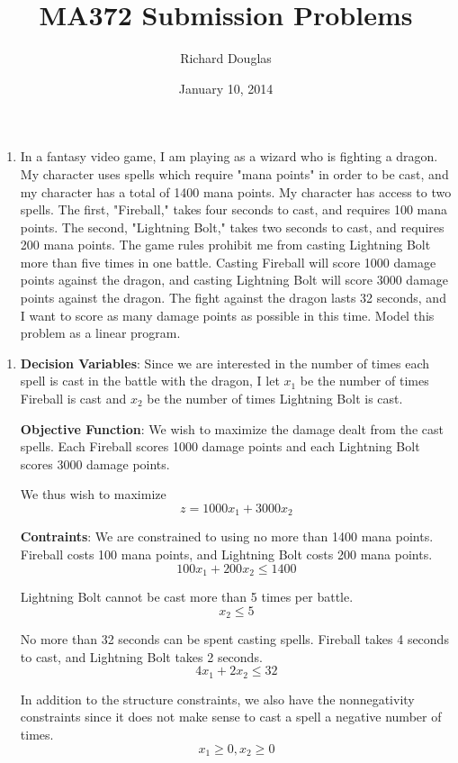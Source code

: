 \documentclass{article}
\title{MA372 Submission Problems}
\author{Richard Douglas}
\date{January 10,  2014}
\begin{document}
  \maketitle
  \begin{enumerate}
  \item In a fantasy video game, I am playing as a wizard who is fighting a dragon. My character
  uses spells which require "mana points" in order to be cast, and my character has a total of
  1400 mana points. My character has access to two spells. The first, "Fireball," takes four
  seconds to cast, and requires 100 mana points. The second, "Lightning Bolt," takes two
  seconds to cast, and requires 200 mana points. The game rules prohibit me from casting
  Lightning Bolt more than five times in one battle. Casting Fireball will score 1000 damage
  points against the dragon, and casting Lightning Bolt will score 3000 damage points against
  the dragon. The fight against the dragon lasts 32 seconds, and I want to score as many
  damage points as possible in this time. Model this problem as a linear program.
  \end{enumerate}
  
  \pagebreak{}
  
  \begin{enumerate}
  \item 
  \textbf{Decision Variables}: Since we are interested in the number of times each spell is cast in the battle with the dragon,
  I let $x_1$ be the number of times Fireball is cast and $x_2$ be the number of times Lightning Bolt is cast. \newline{}
  
  \textbf{Objective Function}: We wish to maximize the damage dealt from the cast spells. 
  Each Fireball scores 1000 damage points and each Lightning Bolt scores 3000 damage points. \newline{}
  
  We thus wish to maximize
  $$z = 1000x_1 + 3000x_2$$
  
   \textbf{Contraints}: We are constrained to using no more than 1400 mana points. 
   Fireball costs 100 mana points, and Lightning Bolt costs 200 mana points.
   $$100x_1 +  200x_2 \le 1400$$
   
   Lightning Bolt cannot be cast more than 5 times per battle.
   $$x_2 \le 5$$
   
   No more than 32 seconds can be spent casting spells.
   Fireball takes 4 seconds to cast, and Lightning Bolt takes 2 seconds.
   $$4x_1 + 2x_2 \le 32$$
   
   In addition to the structure constraints, we also have the nonnegativity constraints since
   it does not make sense to cast a spell a negative number of times.
   $$x_1 \ge 0, x_2 \ge 0$$
  \end{enumerate}
\end{document}

